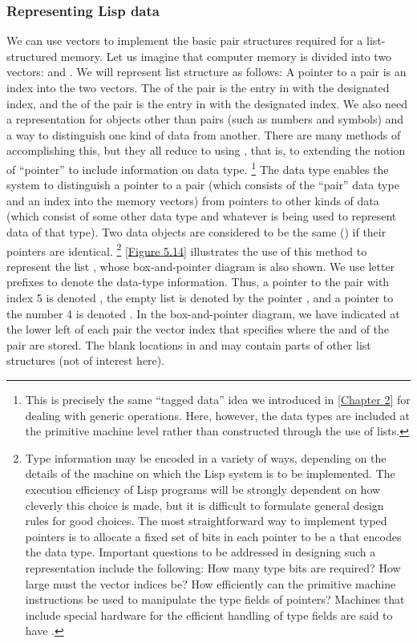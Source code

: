 \subsubsection*{Representing Lisp data}

We can use vectors to implement the basic pair structures required for a list-structured memory.
Let us imagine that computer memory is divided into two vectors:
 and .
We will represent list structure as follows:
A pointer to a pair is an index into the two vectors.
The  of the pair is the entry in  with the designated index, and the  of the pair is the entry in  with the designated index.
We also need a representation for objects other than pairs (such as numbers and symbols) and a way to distinguish one kind of data from another.
There are many methods of accomplishing this, but they all reduce to using , that is, to extending the notion of “pointer” to include information on data type.%
\footnote{
	This is precisely the same “tagged data” idea we introduced in \cref{Chapter 2} for dealing with generic operations.
	Here, however, the data types are included at the primitive machine level rather than constructed through the use of lists.
}
The data type enables the system to distinguish a pointer to a pair (which consists of the “pair” data type and an index into the memory vectors) from pointers to other kinds of data (which consist of some other data type and whatever is being used to represent data of that type).
Two data objects are considered to be the same () if their pointers are identical.%
\footnote{
	Type information may be encoded in a variety of ways, depending on the details of the machine on which the Lisp system is to be implemented.
	The execution efficiency of Lisp programs will be strongly dependent on how cleverly this choice is made, but it is difficult to formulate general design rules for good choices.
	The most straightforward way to implement typed pointers is to allocate a fixed set of bits in each pointer to be a  that encodes the data type.
	Important questions to be addressed in designing such a representation include the following:
	How many type bits are required?
	How large must the vector indices be?
	How efficiently can the primitive machine instructions be used to manipulate the type fields of pointers?
	Machines that include special hardware for the efficient handling of type fields are said to have .
}
\cref{Figure 5.14} illustrates the use of this method to represent the list , whose box-and-pointer diagram is also shown.
We use letter prefixes to denote the data-type information.
Thus, a pointer to the pair with index 5 is denoted , the empty list is denoted by the pointer , and a pointer to the number 4 is denoted .
In the box-and-pointer diagram, we have indicated at the lower left of each pair the vector index that specifies where the  and  of the pair are stored.
The blank locations in  and  may contain parts of other list structures (not of interest here).

